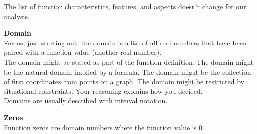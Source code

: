 \documentclass{ximera}
\begin{document}
The list of function characteristics, features, and aspects doesn't change for our analysis. \\





\begin{explanation}  \textbf{\textcolor{blue!75!black}{Domain}} \\

For us, just starting out, the domain is a list of all real numbers that have been paired with a function value (another real number). \\


The domain might be stated as part of the function definition. The domain might be the natural domain implied by a formula.  The domain might be the collection of first coordinates from points on a graph.  The domain might be restricted by situational constraints. Your reasoning explains how you decided. \\


Domains are usually described with interval notation.

\end{explanation}











\begin{explanation}  \textbf{\textcolor{blue!75!black}{Zeros}} \\

Function zeros are domain numbers where the function value is $0$.

\end{explanation}
\end{document}
